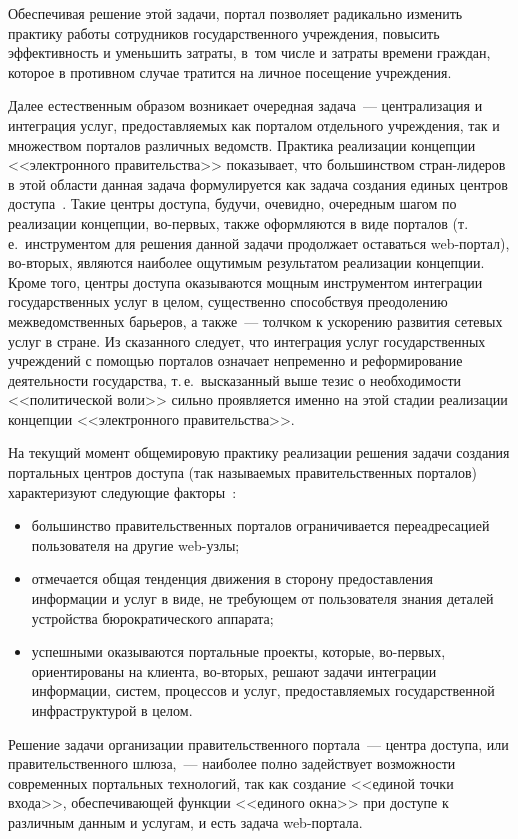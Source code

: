 \begin{multicols}{2}
Обеспечивая решение этой задачи, портал позволяет радикально изменить практику
работы сотрудников государственного учреждения, повысить эффективность и
уменьшить затраты, в~том числе и затраты времени граждан, которое в противном случае
тратится на личное посещение учреждения.

Далее естественным образом возникает очередная задача~--- централизация и интеграция
услуг, предоставляемых как порталом отдельного уч\-реж\-де\-ния, так и множеством
порталов различных  \mbox{ведомств}. Практика реализации концепции <<электронного
правительства>> показывает, что большинством стран-ли\-де\-ров в этой области данная
задача формулируется как задача создания единых центров доступа~\cite{6bos}. Такие
центры доступа, будучи, очевидно, очередным шагом по реализации концепции, 
во-пер\-вых, также оформляются в виде порталов (т.\,е.\ инструментом для решения данной
задачи продолжает оставаться web-портал), во-вто\-рых, являются наиболее ощутимым
результатом реализации концепции. Кроме того, центры доступа оказываются мощным
инструментом интеграции государственных услуг в целом, существенно способствуя
преодолению межведомственных барьеров, а также~--- толчком к ускорению развития
сетевых услуг в стране. Из сказанного следует, что интеграция услуг
государственных уч\-реж\-де\-ний с помощью порталов означает непременно и
реформирование деятельности государства, т.\,е.\ высказанный выше тезис о
необходимости <<политической воли>> сильно проявляется именно на этой стадии
реализации концепции <<электронного правительства>>.

На текущий момент общемировую практику реализации решения задачи создания
портальных центров доступа (так называемых правительственных порталов)
характеризуют следующие факторы~\cite{6bos}:
\begin{itemize}
\item большинство правительственных порталов ограничивается переадресацией
пользователя на другие web-узлы;
\item отмечается общая тенденция движения в сторону предоставления информации и
услуг в виде, не требующем от пользователя знания деталей устройства
бюрократического аппарата;
\item успешными оказываются портальные проекты, которые, во-первых,
ориентированы на клиента, во-вторых, решают задачи интеграции информации,
систем, процессов и услуг, предоставляемых государственной инфраструктурой в
целом.
\end{itemize}

Решение задачи организации правительственного портала~--- центра доступа, или
правительственного шлюза,~--- наиболее полно задействует возможности современных
портальных технологий, так как создание <<единой точки входа>>, обеспечивающей
функции <<единого окна>> при доступе к различным данным и услугам, и есть задача
web-портала.


\end{multicols}
